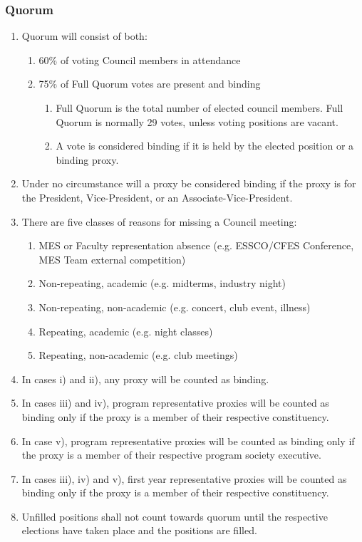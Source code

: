 \subsubsection{Quorum}
\label{quorum}

\begin{enumerate}
 \item
  Quorum will consist of both:

  \begin{enumerate}
   \item
    60\% of voting Council members in attendance
   \item
    75\% of Full Quorum votes are present and binding

    \begin{enumerate}
     \item
      Full Quorum is the total number of elected council members. Full
      Quorum is normally 29 votes, unless voting positions are vacant.
     \item
      A vote is considered binding if it is held by the elected position
      or a binding proxy.
    \end{enumerate}
  \end{enumerate}
 \item
  Under no circumstance will a proxy be considered binding if the proxy
  is for the President, Vice-President, or an Associate-Vice-President.
 \item
  There are five classes of reasons for missing a Council meeting:

  \begin{enumerate}
   \item
    MES or Faculty representation absence (e.g. ESSCO/CFES Conference,
    MES Team external competition)
   \item
    Non-repeating, academic (e.g. midterms, industry night)
   \item
    Non-repeating, non-academic (e.g. concert, club event, illness)
   \item
    Repeating, academic (e.g. night classes)
   \item
    Repeating, non-academic (e.g. club meetings)
  \end{enumerate}
 \item
  In cases i) and ii), any proxy will be counted as binding.
 \item
  In cases iii) and iv), program representative proxies will be counted
  as binding only if the proxy is a member of their respective
  constituency.
 \item
  In case v), program representative proxies will be counted as binding
  only if the proxy is a member of their respective program society
  executive.
 \item
  In cases iii), iv) and v), first year representative proxies will be
  counted as binding only if the proxy is a member of their respective
  constituency.
 \item
  Unfilled positions shall not count towards quorum until the respective
  elections have taken place and the positions are filled.

\end{enumerate}

